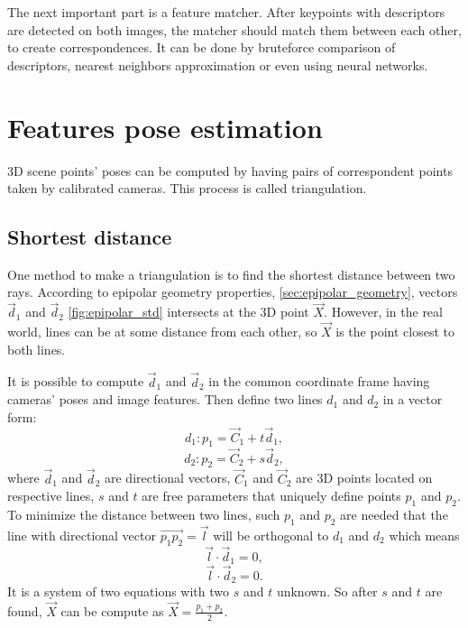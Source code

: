 The next important part is a feature matcher. 
After keypoints with descriptors are detected on both images, the matcher should match them between each other, to create correspondences.
It can be done by bruteforce comparison of descriptors, nearest neighbors approximation or even using neural networks.

\section{Features pose estimation}

3D scene points' poses can be computed by having pairs of correspondent points taken by calibrated cameras.
This process is called triangulation.

\subsection{Shortest distance}
One method to make a triangulation is to find the shortest distance between two rays.
According to epipolar geometry properties, \autoref{sec:epipolar_geometry}, vectors $\vec{d}_1$ and $\vec{d}_2$ \autoref{fig:epipolar_std} intersects at the 3D point $\vec{X}$.
However, in the real world, lines can be at some distance from each other, so $\vec{X}$ is the point closest to both lines.

It is possible to compute $\vec{d}_1$ and $\vec{d}_2$ in the common coordinate frame having cameras' poses and image features.
Then define two lines $d_1$ and $d_2$ in a vector form:
\begin{equation}
    d_1: p_1 = \vec{C}_1 + t \vec{d}_1,
\end{equation}
\begin{equation}
    d_2: p_2 = \vec{C}_2 + s \vec{d}_2,
\end{equation}
where $\vec{d}_1$ and $\vec{d}_2$ are directional vectors, $\vec{C}_1$ and $\vec{C}_2$ are 3D points located on respective lines, $s$ and $t$ are free parameters that uniquely define points $p_1$ and $p_2$. 
To minimize the distance between two lines, such $p_1$ and $p_2$ are needed that the line with directional vector $\vec{p_1p_2} = \vec{l}$ will be orthogonal to $d_1$ and $d_2$ which means
\begin{equation}
    \label{eq:ldd1}
    \vec{l} \cdot \vec{d}_1 = 0,
\end{equation}
\begin{equation}
    \label{eq:ldd2}
    \vec{l} \cdot \vec{d}_2 = 0.
\end{equation}
It is a system of two equations with two $s$ and $t$ unknown.
So after $s$ and $t$ are found, $\vec{X}$ can be compute as $\vec{X} = \frac{p_1 + p_2}{2}$.

